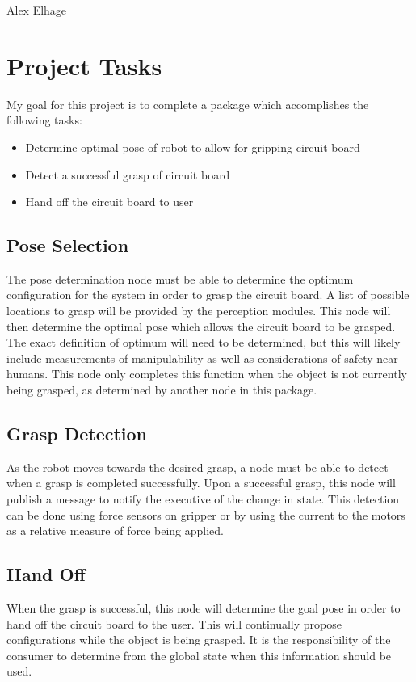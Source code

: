 \documentclass[10pt]{article}
\begin{document}
Alex Elhage

\section{Project Tasks}
My goal for this project is to complete a package which accomplishes the following tasks:
\begin{itemize}
\item Determine optimal pose of robot to allow for gripping circuit board
\item Detect a successful grasp of circuit board
\item Hand off the circuit board to user
\end{itemize}

\subsection{Pose Selection}
The pose determination node must be able to determine the optimum configuration for the system in order to grasp the circuit board. A list of possible locations to grasp will be provided by the perception modules. This node will then determine the optimal pose which allows the circuit board to be grasped. The exact definition of optimum will need to be determined, but this will likely include measurements of manipulability as well as considerations of safety near humans. This node only completes this function when the object is not currently being grasped, as determined by another node in this package.

\subsection{Grasp Detection}
As the robot moves towards the desired grasp, a node must be able to detect when a grasp is completed successfully. Upon a successful grasp, this node will publish a message to notify the executive of the change in state. This detection can be done using force sensors on gripper or by using the current to the motors as a relative measure of force being applied.

\subsection{Hand Off}
When the grasp is successful, this node will determine the goal pose in order to hand off the circuit board to the user. This will continually propose configurations while the object is being grasped. It is the responsibility of the consumer to determine from the global state when this information should be used.
\end{document}
